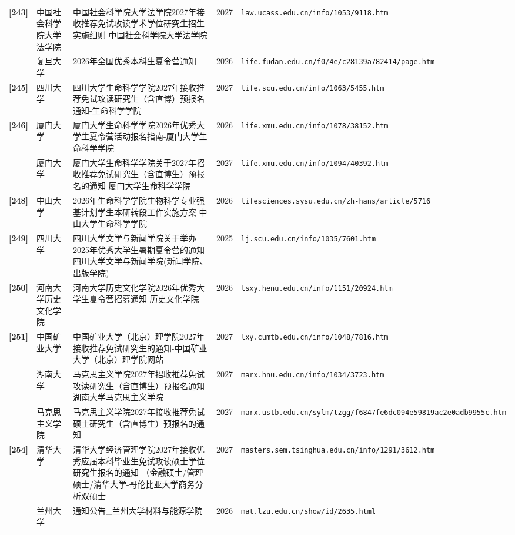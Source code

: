 {\begin{longtable}{@{}p{1.15cm}p{2.9cm}p{6.3cm}p{0.85cm}p{5.0cm}@{}}
\textbf{[243]} & 中国社会科学院大学法学院 & 中国社会科学院大学法学院2027年接收推荐免试攻读学术学位研究生招生实施细则-中国社会科学院大学法学院 & 2027 & \texttt{law.ucass.edu.cn/info/1053/9118.htm} \\
[244] & 复旦大学 & 2026年全国优秀本科生夏令营通知 & 2026 & \texttt{life.fudan.edu.cn/f0/4e/c28139a782414/page.htm} \\
\textbf{[245]} & 四川大学 & 四川大学生命科学学院2027年接收推荐免试攻读研究生（含直博）预报名通知-生命科学学院 & 2027 & \texttt{life.scu.edu.cn/info/1063/5455.htm} \\
\textbf{[246]} & 厦门大学 & 厦门大学生命科学学院2026年优秀大学生夏令营活动报名指南-厦门大学生命科学学院 & 2026 & \texttt{life.xmu.edu.cn/info/1078/38152.htm} \\
[247] & 厦门大学 & 厦门大学生命科学学院关于2027年招收推荐免试研究生（含直博生）预报名的通知-厦门大学生命科学学院 & 2027 & \texttt{life.xmu.edu.cn/info/1094/40392.htm} \\
\textbf{[248]} & 中山大学 & 2026年生命科学学院生物科学专业强基计划学生本研转段工作实施方案 \textbar{} 中山大学生命科学学院 & 2026 & \texttt{lifesciences.sysu.edu.cn/zh-hans/article/5716} \\
\textbf{[249]} & 四川大学 & 四川大学文学与新闻学院关于举办2025年优秀大学生暑期夏令营的通知-四川大学文学与新闻学院(新闻学院、出版学院) & 2025 & \texttt{lj.scu.edu.cn/info/1035/7601.htm} \\
\textbf{[250]} & 河南大学历史文化学院 & 河南大学历史文化学院2026年优秀大学生夏令营招募通知-历史文化学院 & 2026 & \texttt{lsxy.henu.edu.cn/info/1151/20924.htm} \\
\textbf{[251]} & 中国矿业大学 & 中国矿业大学（北京）理学院2027年接收推荐免试研究生的通知-中国矿业大学（北京）理学院网站 & 2027 & \texttt{lxy.cumtb.edu.cn/info/1048/7816.htm} \\
[252] & 湖南大学 & 马克思主义学院2027年招收推荐免试攻读研究生（含直博生）预报名通知-湖南大学马克思主义学院 & 2027 & \texttt{marx.hnu.edu.cn/info/1034/3723.htm} \\
[253] & 马克思主义学院 & 马克思主义学院2027年接收推荐免试硕士研究生（含直博生）预报名的通知 & 2027 & \texttt{marx.ustb.edu.cn/sylm/tzgg/f6847fe6dc094e59819ac2e0adb9955c.htm} \\
\textbf{[254]} & 清华大学 & 清华大学经济管理学院2027年接收优秀应届本科毕业生免试攻读硕士学位研究生报名的通知 （金融硕士/管理硕士/清华大学-哥伦比亚大学商务分析双硕士 & 2027 & \texttt{masters.sem.tsinghua.edu.cn/info/1291/3612.htm} \\
[255] & 兰州大学 & 通知公告\_兰州大学材料与能源学院 & 2026 & \texttt{mat.lzu.edu.cn/show/id/2635.html} \\

\end{longtable}}
